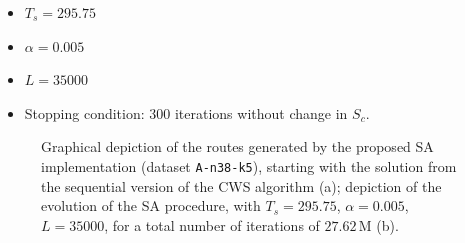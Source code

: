 \begin{itemize}

    \item $T_s = 295.75$
    \item $\alpha = 0.005$
    \item $L = 35000$
    \item Stopping condition: 300 iterations without change in $S_c$.

\end{itemize}\vertbreak

\begin{figure}[h!]
    \centering



    \cprotect\caption{Graphical depiction of the routes generated 
            by the proposed SA implementation (dataset \verb?A-n38-k5?), starting 
            with the solution from the sequential version of the CWS algorithm 
            (a); depiction of the evolution of the SA procedure, with 
            $T_s = 295.75$, $\alpha = 0.005$, $L = 35000$, for a total number of 
            iterations of $27.62$\,M (b).}
    \label{fig:A-n38-k5-s-sa}

\end{figure}

